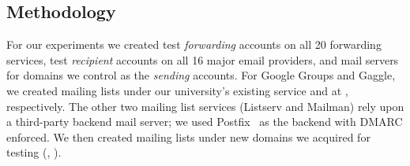 
\subsection{Methodology}
\label{sec:methodology}


For our experiments we created test \textit{forwarding} accounts on all 20 forwarding services,
test \textit{recipient} accounts on all 16 major
email providers, and mail servers for domains we control as
the \textit{sending} accounts.
%
%
For Google Groups and Gaggle, we created mailing lists under our
university's existing service and at , respectively.
The other two mailing list services (Listserv and Mailman) rely upon a
third-party backend mail server; we used
Postfix~\cite{ThePostf34:online} as the backend with DMARC
enforced. We then created mailing lists under new domains we acquired
for testing (\eg, ).


